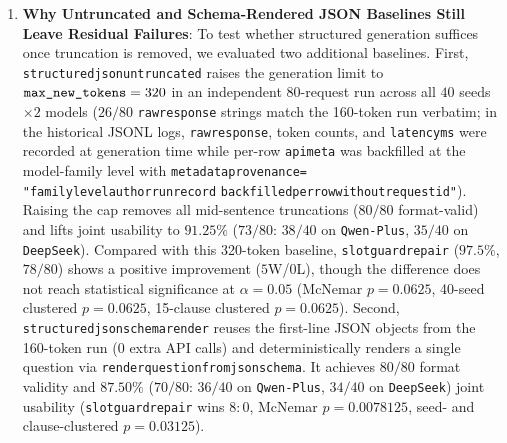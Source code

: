 \documentclass[10pt,twocolumn]{article}
\renewcommand{\_}{\textunderscore\allowbreak}
\begin{document}
\begin{enumerate}[leftmargin=*,nosep]
  \item \textbf{Why Untruncated and Schema-Rendered JSON Baselines Still Leave Residual Failures}: To test whether structured generation suffices once truncation is removed, we evaluated two additional baselines. First, \texttt{structured\_json\_untruncated\_320} raises the generation limit to $\texttt{max\_new\_tokens}=320$ in an independent 80-request run across all $40$ seeds $\times 2$ models ($26/80$ \texttt{raw\_response} strings match the 160-token run verbatim; in the historical JSONL logs, \texttt{raw\_response}, token counts, and \texttt{latency\_ms} were recorded at generation time while per-row \texttt{api\_meta} was backfilled at the model-family level with \texttt{metadata\_provenance=} \allowbreak \texttt{"family\_level\_author\_run\_record\_} \allowbreak \texttt{backfilled\_per\_row\_without\_request\_id"}). Raising the cap removes all mid-sentence truncations ($80/80$ format-valid) and lifts joint usability to $91.25\%$ ($73/80$: $38/40$ on \texttt{Qwen-Plus}, $35/40$ on \texttt{DeepSeek}). Compared with this 320-token baseline, \texttt{slot\_guard\_repair} ($97.5\%$, $78/80$) shows a positive improvement ($5$W/$0$L), though the difference does not reach statistical significance at $\alpha=0.05$ (McNemar $p=0.0625$, 40-seed clustered $p=0.0625$, 15-clause clustered $p=0.0625$). Second, \texttt{structured\_json\_schema\_render} reuses the first-line JSON objects from the 160-token run ($0$ extra API calls) and deterministically renders a single question via \texttt{render\_question\_from\_json\_schema}. It achieves $80/80$ format validity and $87.50\%$ ($70/80$: $36/40$ on \texttt{Qwen-Plus}, $34/40$ on \texttt{DeepSeek}) joint usability (\texttt{slot\_guard\_repair} wins $8:0$, McNemar $p=0.0078125$, seed- and clause-clustered $p=0.03125$).


\end{enumerate}
\end{document}
